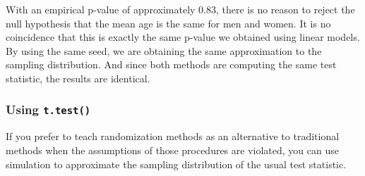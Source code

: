 \begin{knitrout}
\end{knitrout}

With an empirical p-value of approximately 0.83, 
there is no reason to reject the null hypothesis that the mean
age is the same for men and women.  It is no coincidence that this is exactly the same
p-value we obtained using linear models.  By using the same seed, we are obtaining the same
approximation to the sampling distribution.  And since both methods are computing the same
test statistic, the results are identical.


\subsubsection{Using \texttt{t.test()}}

If you prefer to teach randomization methods as an alternative to traditional 
methods when the assumptions of those procedures are violated, you can use 
simulation to approximate the sampling distribution of the usual test statistic.

